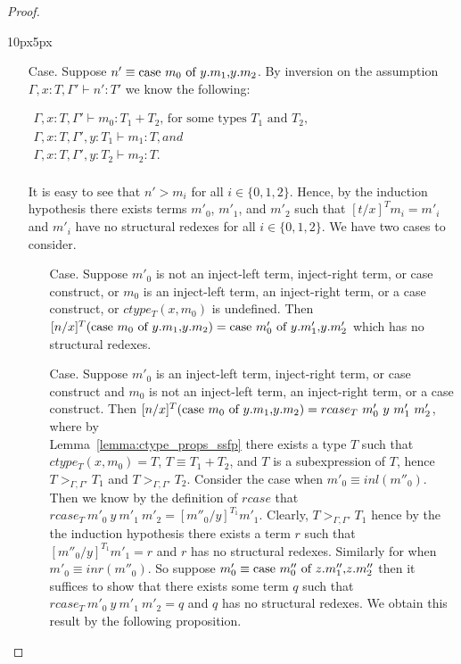 \begin{proof}
\begin{changemargin}{10px}{5px}
\begin{itemize}
\item[Case.] Suppose $n' \equiv \mbox{case}\ m_0\ \text{of}\ y\text{.}m_1\text{,}y\text{.}m_2$. By inversion on the assumption
  $\Gamma,x:T,\Gamma' \vdash n':T'$ we know the following:
  \begin{center}
    \begin{math}
      \begin{array}{lll}
        \Gamma,x:T,\Gamma' \vdash m_0:T_1+T_2 \text{, for some types } T_1 \text{ and } T_2,\\
        \Gamma,x:T,\Gamma',y:T_1 \vdash m_1:T, and\\
        \Gamma,x:T,\Gamma',y:T_2 \vdash m_2:T.\\
      \end{array}
    \end{math}
  \end{center}
  It is easy to see that
  $n' > m_i$ for all $i \in \{0,1,2\}$.  Hence, by the induction hypothesis
  there exists terms $m'_0$, $m'_1$, and $m'_2$ such that $[t/x]^T m_i = m'_i$ and $m'_i$ have no structural redexes
  for all $i \in \{0,1,2\}$.  We have two cases to consider.
  \begin{itemize}
  \item[Case.] Suppose $m'_0$ is not an inject-left term, inject-right term, or case construct, or
    $m_0$ is an inject-left term, an inject-right term, or a case construct, or $ctype_T(x,m_0)$ is undefined.
    Then \\
    $[n/x]^{T} (\mbox{case}\ m_0\ \text{of}\ y\text{.}m_1\text{,}y\text{.}m_2) = \mbox{case}\ m'_0\ \text{of}\ y\text{.}m'_1\text{,}y\text{.}m'_2$ which has no structural redexes.
    
  \item[Case.] Suppose $m'_0$ is an inject-left term, inject-right term, or case construct and $m_0$ is not
    an inject-left term, an inject-right term, or a case construct.  Then
    $[n/x]^{T} (\mbox{case}\ m_0\ \text{of}\ y\text{.}m_1\text{,}y\text{.}m_2) = rcase_{T}\ m'_0\ y\ m'_1\ m'_2$, where by \\
    Lemma~\ref{lemma:ctype_props_ssfp}
    there exists a type $T$ such that $ctype_T(x,m_0) = T$, $T \equiv T_1+T_2$, and $T$ is a subexpression
    of $T$, hence $T >_{\Gamma,\Gamma'} T_1$ and $T >_{\Gamma,\Gamma'} T_2$.
    Consider the case when $m'_0 \equiv inl(m''_0)$.  Then we know by the definition of $rcase$ that
    $rcase_{T}\ m'_0\ y\ m'_1\ m'_2 = [m''_0/y]^{T_1} m'_1$.  Clearly, $T >_{\Gamma,\Gamma'} T_1$ hence
    by the the induction hypothesis there exists a term $r$ such that $[m''_0/y]^{T_1} m'_1 = r$ and
    $r$ has no structural redexes. Similarly for when $m'_0 \equiv inr(m''_0)$.  
    So suppose $m'_0 \equiv \mbox{case}\ m''_0\ \text{of}\ z\text{.}m''_1\text{,}z\text{.}m''_2$ then it suffices to show that there exists some term
    $q$ such that $rcase_{T}\ m'_0\ y\ m'_1\ m'_2 = q$ and $q$ has no structural redexes.  We obtain this
    result by the following proposition.
         

\end{itemize}
\end{itemize}
\end{changemargin}
\end{proof}
